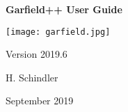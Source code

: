\begin{titlepage}
  {
  \centering
  \sffamily
  \linespread{1.5}

  \vspace{3cm} 

  \huge{\textbf{Garfield++ User Guide}}

  \vspace{2cm}

  \texttt{[image: garfield.jpg]}

  \vspace{2cm}

  \large
  Version 2019.6 

  \vspace{2cm}
  \large
  H. Schindler

  \vfill

  September 2019

  }
\end{titlepage}
